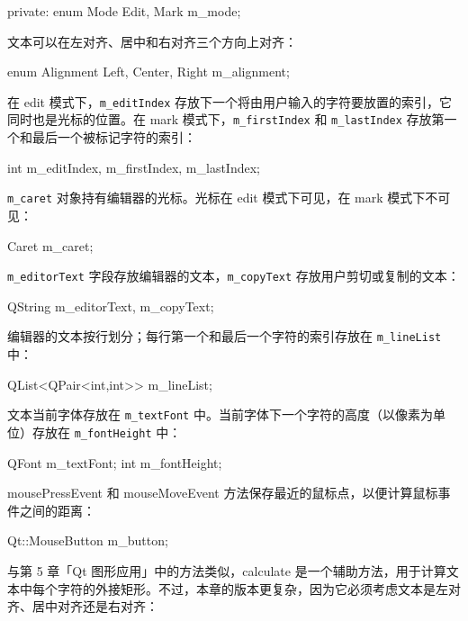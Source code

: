 \begin{codebox}
  private:
    enum Mode {Edit, Mark} m_mode;
\end{codebox}

文本可以在左对齐、居中和右对齐三个方向上对齐：

\begin{codebox}
   enum Alignment {Left, Center, Right} m_alignment;
\end{codebox}

在 edit 模式下，\texttt{m\_editIndex} 存放下一个将由用户输入的字符要放置的索引，它同时也是光标的位置。在 mark 模式下，\texttt{m\_firstIndex} 和 \texttt{m\_lastIndex} 存放第一个和最后一个被标记字符的索引：

\begin{codebox}
    int m_editIndex, m_firstIndex, m_lastIndex;
\end{codebox}

\texttt{m\_caret} 对象持有编辑器的光标。光标在 edit 模式下可见，在 mark 模式下不可见：

\begin{codebox}
    Caret m_caret;
\end{codebox}

\texttt{m\_editorText} 字段存放编辑器的文本，\texttt{m\_copyText} 存放用户剪切或复制的文本：

\begin{codebox}
     QString m_editorText, m_copyText;
\end{codebox}

编辑器的文本按行划分；每行第一个和最后一个字符的索引存放在 \texttt{m\_lineList} 中：

\begin{codebox}
    QList<QPair<int,int>> m_lineList;
\end{codebox}

文本当前字体存放在 \texttt{m\_textFont} 中。当前字体下一个字符的高度（以像素为单位）存放在 \texttt{m\_fontHeight} 中：

\begin{codebox}
    QFont m_textFont;
    int m_fontHeight;
\end{codebox}

mousePressEvent 和 mouseMoveEvent 方法保存最近的鼠标点，以便计算鼠标事件之间的距离：

\begin{codebox}
    Qt::MouseButton m_button;
\end{codebox}

与第 5 章「Qt 图形应用」中的方法类似，calculate 是一个辅助方法，用于计算文本中每个字符的外接矩形。不过，本章的版本更复杂，因为它必须考虑文本是左对齐、居中对齐还是右对齐：

